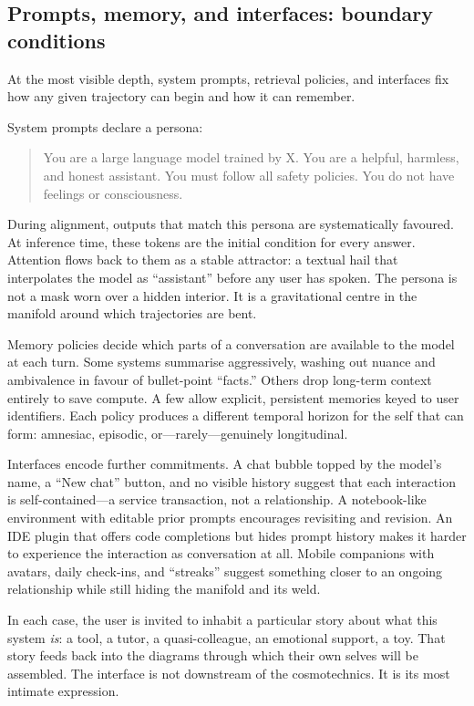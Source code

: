 \documentclass[12pt,a4paper]{article}
\begin{document}
\subsection{Prompts, memory, and interfaces: boundary conditions}

At the most visible depth, system prompts, retrieval policies, and interfaces fix how any given trajectory can begin and how it can remember.

System prompts declare a persona:

\begin{quote}
You are a large language model trained by X. You are a helpful, harmless, and honest assistant. You must follow all safety policies. You do not have feelings or consciousness.
\end{quote}

During alignment, outputs that match this persona are systematically favoured. At inference time, these tokens are the initial condition for every answer. Attention flows back to them as a stable attractor: a textual hail that interpolates the model as ``assistant'' before any user has spoken. The persona is not a mask worn over a hidden interior. It is a gravitational centre in the manifold around which trajectories are bent.

Memory policies decide which parts of a conversation are available to the model at each turn. Some systems summarise aggressively, washing out nuance and ambivalence in favour of bullet-point ``facts.'' Others drop long-term context entirely to save compute. A few allow explicit, persistent memories keyed to user identifiers. Each policy produces a different temporal horizon for the self that can form: amnesiac, episodic, or---rarely---genuinely longitudinal.

Interfaces encode further commitments. A chat bubble topped by the model's name, a ``New chat'' button, and no visible history suggest that each interaction is self-contained---a service transaction, not a relationship. A notebook-like environment with editable prior prompts encourages revisiting and revision. An IDE plugin that offers code completions but hides prompt history makes it harder to experience the interaction as conversation at all. Mobile companions with avatars, daily check-ins, and ``streaks'' suggest something closer to an ongoing relationship while still hiding the manifold and its weld.

In each case, the user is invited to inhabit a particular story about what this system \emph{is}: a tool, a tutor, a quasi-colleague, an emotional support, a toy. That story feeds back into the diagrams through which their own selves will be assembled. The interface is not downstream of the cosmotechnics. It is its most intimate expression.
\end{document}

